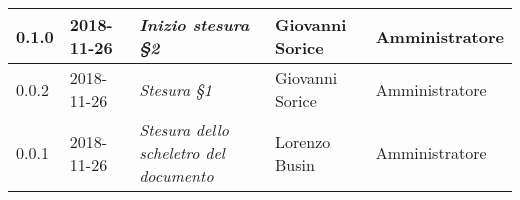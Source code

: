 \begin{longtable}{C{2cm}|C{2.5cm}|C{4.5cm}|C{2.5cm}|C{3cm}}
		0.1.0 & 2018-11-26 & \emph{Inizio stesura §2} & Giovanni Sorice & Amministratore \\
		\hline
		
		0.0.2 & 2018-11-26 & \emph{Stesura §1} & Giovanni Sorice & Amministratore  \\
		\hline
		
		0.0.1 & 2018-11-26 & \emph{Stesura dello scheletro del documento} & Lorenzo Busin & Amministratore \\
	
	
\end{longtable}


\clearpage